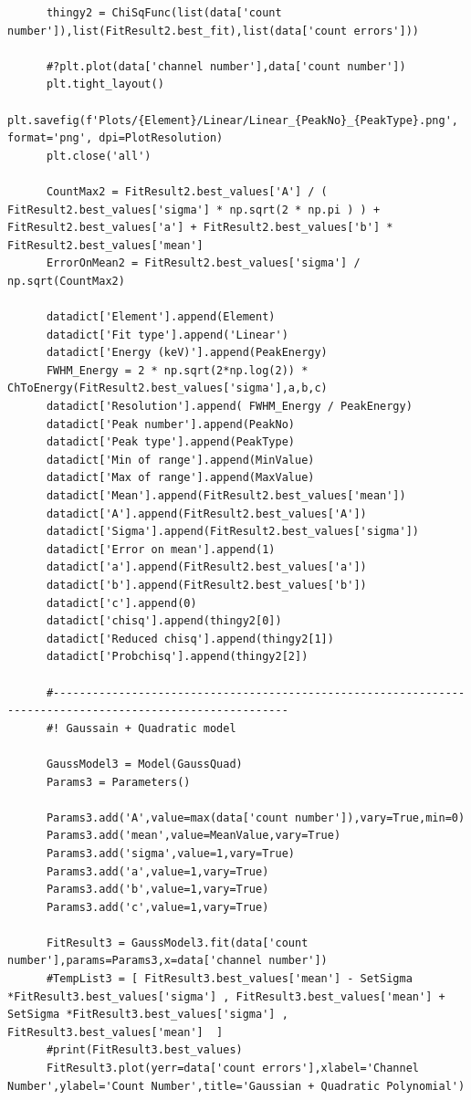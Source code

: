\documentclass[11pt,a4paper]{article}
\begin{document}
\begin{verbatim}
      thingy2 = ChiSqFunc(list(data['count number']),list(FitResult2.best_fit),list(data['count errors']))

      #?plt.plot(data['channel number'],data['count number'])
      plt.tight_layout()
      plt.savefig(f'Plots/{Element}/Linear/Linear_{PeakNo}_{PeakType}.png', format='png', dpi=PlotResolution)
      plt.close('all')

      CountMax2 = FitResult2.best_values['A'] / ( FitResult2.best_values['sigma'] * np.sqrt(2 * np.pi ) ) + FitResult2.best_values['a'] + FitResult2.best_values['b'] * FitResult2.best_values['mean']
      ErrorOnMean2 = FitResult2.best_values['sigma'] / np.sqrt(CountMax2)
      
      datadict['Element'].append(Element)
      datadict['Fit type'].append('Linear')
      datadict['Energy (keV)'].append(PeakEnergy)
      FWHM_Energy = 2 * np.sqrt(2*np.log(2)) * ChToEnergy(FitResult2.best_values['sigma'],a,b,c)
      datadict['Resolution'].append( FWHM_Energy / PeakEnergy)
      datadict['Peak number'].append(PeakNo)
      datadict['Peak type'].append(PeakType)
      datadict['Min of range'].append(MinValue)
      datadict['Max of range'].append(MaxValue)
      datadict['Mean'].append(FitResult2.best_values['mean'])
      datadict['A'].append(FitResult2.best_values['A'])
      datadict['Sigma'].append(FitResult2.best_values['sigma'])
      datadict['Error on mean'].append(1)
      datadict['a'].append(FitResult2.best_values['a'])
      datadict['b'].append(FitResult2.best_values['b'])
      datadict['c'].append(0)
      datadict['chisq'].append(thingy2[0])
      datadict['Reduced chisq'].append(thingy2[1])
      datadict['Probchisq'].append(thingy2[2])

      #----------------------------------------------------------------------------------------------------------
      #! Gaussain + Quadratic model 

      GaussModel3 = Model(GaussQuad)
      Params3 = Parameters()

      Params3.add('A',value=max(data['count number']),vary=True,min=0)
      Params3.add('mean',value=MeanValue,vary=True)
      Params3.add('sigma',value=1,vary=True)
      Params3.add('a',value=1,vary=True)
      Params3.add('b',value=1,vary=True)
      Params3.add('c',value=1,vary=True)

      FitResult3 = GaussModel3.fit(data['count number'],params=Params3,x=data['channel number'])
      #TempList3 = [ FitResult3.best_values['mean'] - SetSigma *FitResult3.best_values['sigma'] , FitResult3.best_values['mean'] + SetSigma *FitResult3.best_values['sigma'] , FitResult3.best_values['mean']  ] 
      #print(FitResult3.best_values)
      FitResult3.plot(yerr=data['count errors'],xlabel='Channel Number',ylabel='Count Number',title='Gaussian + Quadratic Polynomial')


\end{verbatim}
\end{document}
